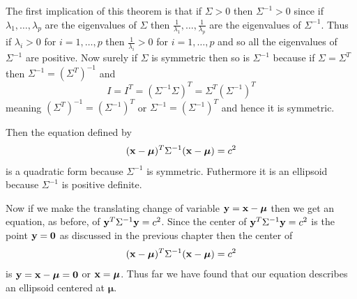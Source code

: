 \documentclass{book}
\newcommand{\bs}[1]{\boldsymbol{#1}}
\begin{document}
The first implication of this theorem is that if $\Sigma >0$ then $\Sigma^{-1}>0$ since if $\lambda_1,\ldots,\lambda_p$ are the eigenvalues of $\Sigma$ then $\frac{1}{\lambda_1},\ldots,\frac{1}{\lambda_p}$ are the eigenvalues of $\Sigma^{-1}$. Thus if $\lambda_i>0$ for $i=1,\ldots,p$ then $\frac{1}{\lambda_i}>0$ for $i=1,\ldots,p$ and so all the eigenvalues of $\Sigma^{-1}$ are positive. Now surely if $\Sigma$ is symmetric then so is $\Sigma^{-1}$ because if $\Sigma=\Sigma^T$ then $\Sigma^{-1}=(\Sigma^T)^{-1}$ and 
$$
I=I^T=(\Sigma^{-1}\Sigma)^T=\Sigma^T(\Sigma^{-1})^T
$$
meaning $(\Sigma^T)^{-1}=(\Sigma^{-1})^T$ or $\Sigma^{-1}=(\Sigma^{-1})^T$ and hence it is symmetric.


Then the equation defined by 
$$
({\bf x}-\bs{\mu})^T\Sigma^{-1}({\bf x}-\bs{\mu})=c^2
$$
is a quadratic form because $\Sigma^{-1}$ is symmetric. Futhermore it is an ellipsoid because $\Sigma^{-1}$ is positive definite. 

Now if we make the translating change of variable ${\bf y}={\bf x}-\bs{\mu}$ then we get an equation, as before, of ${\bf y}^T\Sigma^{-1}{\bf y}=c^2$. Since the center of ${\bf y}^T\Sigma^{-1}{\bf y}=c^2$ is the point ${\bf y}=\bs{0}$ as discussed in the previous chapter then the center of 
$$
({\bf x}-\bs{\mu})^T\Sigma^{-1}({\bf x}-\bs{\mu})=c^2
$$
is ${\bf y}={\bf x}-\bs{\mu}=\bs{0}$ or ${\bf x}=\bs{\mu}$. Thus far we have found that our equation describes an ellipsoid centered at $\bs{\mu}$.
\end{document}
